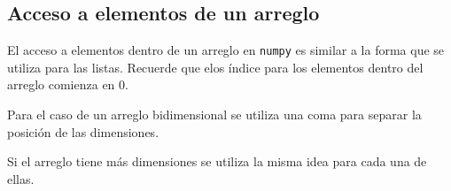 \subsection{Acceso a elementos de un arreglo}

El acceso a elementos dentro de un arreglo en \texttt{numpy} es similar
a la forma que se utiliza para las listas. Recuerde que elos índice para
los elementos dentro del arreglo comienza en 0.

\begin{Shaded}
\begin{Highlighting}[]
\OperatorTok{=}\NormalTok{ np.array([}\NormalTok{, }\NormalTok{, }\NormalTok{, }\NormalTok{, }\NormalTok{])}
    \NormalTok{(arreglo[}\NormalTok{])}
\end{Highlighting}
\end{Shaded}

Para el caso de un arreglo bidimensional se utiliza una coma para separar la posición de las dimensiones.

\begin{Shaded}
\begin{Highlighting}[]
\OperatorTok{=}\NormalTok{ np.array([[}\NormalTok{, }\NormalTok{, }\NormalTok{], [}\NormalTok{, }\NormalTok{, }\NormalTok{]])}
    \NormalTok{(arreglo[}\NormalTok{, }\NormalTok{]) }
\end{Highlighting}
\end{Shaded}

Si el arreglo tiene más dimensiones se utiliza la misma idea para cada una de ellas.

\begin{Shaded}
\begin{Highlighting}[]
\OperatorTok{=}\NormalTok{ np.array([[[}\NormalTok{, }\NormalTok{, }\NormalTok{], [}\NormalTok{, }\NormalTok{, }\NormalTok{]],[[}\NormalTok{, }\NormalTok{, }\NormalTok{], [}\NormalTok{, }\NormalTok{, }\NormalTok{]])}
    \NormalTok{(arreglo[}\NormalTok{, }\NormalTok{, }\NormalTok{]) }
\end{Highlighting}
\end{Shaded}

